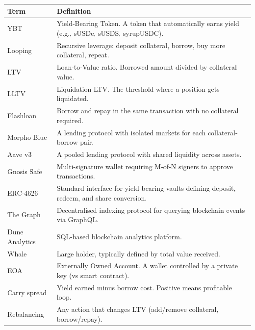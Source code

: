 \begin{tabular}{p{3.5cm} p{9cm}}
\hline
\textbf{Term} & \textbf{Definition} \\
\hline
YBT & Yield-Bearing Token. A token that automatically earns yield (e.g., sUSDe, sUSDS, syrupUSDC). \\
Looping & Recursive leverage: deposit collateral, borrow, buy more collateral, repeat. \\
LTV & Loan-to-Value ratio. Borrowed amount divided by collateral value. \\
LLTV & Liquidation LTV. The threshold where a position gets liquidated. \\
Flashloan & Borrow and repay in the same transaction with no collateral required. \\
Morpho Blue & A lending protocol with isolated markets for each collateral-borrow pair. \\
Aave v3 & A pooled lending protocol with shared liquidity across assets. \\
Gnosis Safe & Multi-signature wallet requiring M-of-N signers to approve transactions. \\
ERC-4626 & Standard interface for yield-bearing vaults defining deposit, redeem, and share conversion. \\
The Graph & Decentralised indexing protocol for querying blockchain events via GraphQL. \\
Dune Analytics & SQL-based blockchain analytics platform. \\
Whale & Large holder, typically defined by total value received. \\
EOA & Externally Owned Account. A wallet controlled by a private key (vs smart contract). \\
Carry spread & Yield earned minus borrow cost. Positive means profitable loop. \\
Rebalancing & Any action that changes LTV (add/remove collateral, borrow/repay). \\
\hline
\end{tabular}
